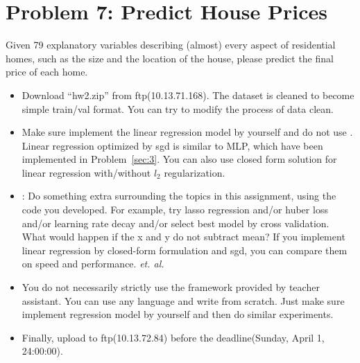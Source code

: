 \documentclass[12pt]{article}
\begin{document}
\section{Problem 7: Predict House Prices} \label{sec:4}
Given 79 explanatory variables describing (almost) every aspect of residential homes, such as the size  and the location of the house, please predict the final price of each home.

\begin{itemize}	
	\item  Download ``hw2.zip'' from ftp(10.13.71.168). The dataset is cleaned to become simple train/val format. You can try to modify the process of data clean.
	\item Make sure implement the {\color{red}linear} regression model by yourself and do not use {\color{red}{`LinearRegression' in `skleanr'}}.  Linear regression optimized by sgd is similar to MLP, which have been implemented in  Problem~\ref{sec:3}. You can also use closed form solution for linear regression with/without $l_2$ regularization. 

	\item {\color{red}{Bonus(answer one of them is enough)}}: Do something extra surrounding the topics in this assignment, using the code you developed. For example, try lasso regression and/or huber loss and/or learning rate decay and/or select best model by cross validation. What would happen if the x and y do not subtract mean? If you implement linear  regression by  closed-form formulation and sgd, you can compare them on speed and performance. \textit{et. al.}

	\item You do not necessarily strictly use the framework provided by teacher assistant. You can use any language and write from scratch. Just make sure implement regression model by yourself and then do similar experiments.
	\item Finally, upload to ftp(10.13.72.84) before the deadline(Sunday, April 1, 24:00:00).
\end{itemize}
\end{document}
